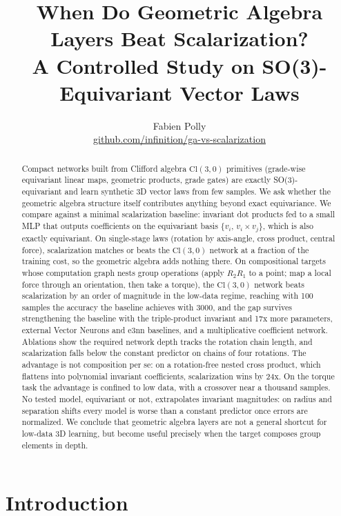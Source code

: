 \documentclass[11pt]{article}
\title{When Do Geometric Algebra Layers Beat Scalarization?\\
A Controlled Study on SO(3)-Equivariant Vector Laws}
\author{Fabien Polly\\ \href{https://github.com/infinition/ga-vs-scalarization}{github.com/infinition/ga-vs-scalarization}}
\date{}
\begin{document}
\maketitle

\begin{abstract}
Compact networks built from Clifford algebra $\mathrm{Cl}(3,0)$ primitives
(grade-wise equivariant linear maps, geometric products, grade gates) are
exactly SO(3)-equivariant and learn synthetic 3D vector laws from few samples.
We ask whether the geometric algebra structure itself contributes anything
beyond exact equivariance. We compare against a minimal scalarization baseline:
invariant dot products fed to a small MLP that outputs coefficients on the
equivariant basis $\{v_i,\, v_i \times v_j\}$, which is also exactly
equivariant. On single-stage laws (rotation by axis-angle, cross product,
central force), scalarization matches or beats the $\mathrm{Cl}(3,0)$ network
at a fraction of the training cost, so the geometric algebra adds nothing
there. On compositional targets whose computation graph nests group
operations (apply $R_2 R_1$ to a point; map a local force through an
orientation, then take a torque), the $\mathrm{Cl}(3,0)$ network beats
scalarization by an order of magnitude in the low-data regime, reaching with
100 samples the accuracy the baseline achieves with 3000, and the gap survives
strengthening the baseline with the triple-product invariant and 17x more
parameters, external Vector Neurons and e3nn baselines, and a multiplicative
coefficient network. Ablations show the required network depth tracks the
rotation chain length, and scalarization falls below the constant predictor
on chains of four rotations. The advantage is not composition per se: on a
rotation-free nested cross product, which flattens into polynomial invariant
coefficients, scalarization wins by 24x. On the torque task the advantage is
confined to low data, with a crossover near a thousand samples. No tested
model, equivariant or not, extrapolates invariant
magnitudes: on radius and separation shifts every model is worse than a
constant predictor once errors are normalized. We conclude that geometric
algebra layers are not a general shortcut for low-data 3D learning, but become
useful precisely when the target composes group elements in depth.
\end{abstract}

\section{Introduction}
\end{document}
